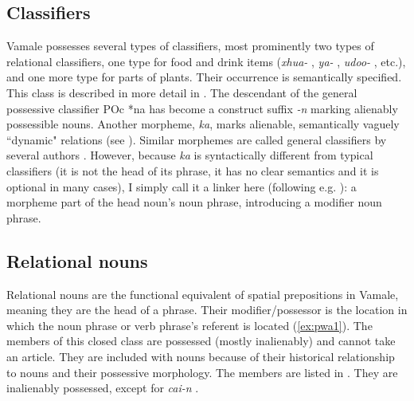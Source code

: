 \subsection{Classifiers}
\label{ssec:WCClass}
Vamale possesses several types of classifiers, most prominently two types of relational classifiers, one type for food and drink items (\textit{xhua-} , \textit{ya-} , \textit{udoo-} , etc.), and one more type for parts of plants. Their occurrence is semantically specified. This class is described in more detail in .
The descendant of the general possessive classifier POc *na has become a construct suffix \textit{-n} marking alienably possessible nouns. Another morpheme, \textit{ka}, marks alienable, semantically vaguely ``dynamic" relations (see ). Similar morphemes are called general classifiers by several authors \parencite{lichtenberk_oceanic_2009,lichtenberk_possessive_1985,lynch_historical_2000}. However, because \textit{ka} is syntactically different from typical classifiers (it is not the head of its phrase, it has no clear semantics and it is optional in many cases), I simply call it a linker here (following e.g. \cite{bril_ownership_2012}): a morpheme part of the head noun's noun phrase, introducing a modifier noun phrase.

\subsection{Relational nouns}
\label{ssec:WCPrepoNouns}

Relational nouns are the functional equivalent of spatial prepositions in Vamale, meaning they are the head of a phrase. Their modifier\slash possessor is the location in which the noun phrase or verb phrase's referent is located (\ref{ex:pwa1}). The members of this closed class are possessed (mostly inalienably) and cannot take an article. They are included with nouns because of their historical relationship to nouns %
 and their possessive morphology. The members are listed in . They are inalienably possessed, except for \textit{cai-n} . 
 
